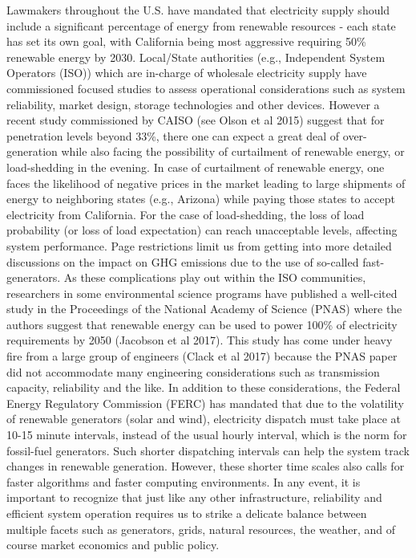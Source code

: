 Lawmakers throughout the U.S. have mandated that electricity supply should include a significant percentage of energy from renewable resources - each state has set its own goal, with California being most aggressive requiring 50\% renewable energy by 2030.  Local/State authorities (e.g., Independent System Operators (ISO)) which are in-charge of wholesale electricity supply have commissioned focused studies to assess operational considerations such as system reliability, market design, storage technologies and other devices.  However a recent study commissioned by CAISO (see Olson et al 2015) suggest that for penetration levels beyond 33\%, there one can expect a great deal of over-generation  while also facing the possibility of curtailment of renewable energy, or load-shedding in the evening.  In case of curtailment of renewable energy, one faces the likelihood of negative prices in the market leading to large shipments of energy to neighboring states (e.g., Arizona) while paying those states to accept electricity from California. For the case of load-shedding, the loss of load probability (or loss of load expectation) can reach unacceptable levels, affecting system performance.  Page restrictions limit us from getting into more detailed discussions on the impact on GHG emissions due to the use of so-called fast-generators.  As these complications play out within the ISO communities, researchers in some environmental science programs have published a well-cited study in the Proceedings of the National Academy of Science (PNAS) where the authors suggest that renewable energy can be used to power 100\% of electricity requirements by 2050  (Jacobson et al 2017).  This study has come under heavy fire from a large group of engineers (Clack et al 2017) because the PNAS paper did not accommodate many engineering considerations such as transmission capacity, reliability and the like.   In addition to these considerations, the Federal Energy Regulatory Commission (FERC) has mandated that due to the volatility of renewable generators (solar and wind), electricity dispatch must take place at 10-15 minute intervals, instead of the usual hourly interval, which is the norm for fossil-fuel generators.  Such shorter dispatching intervals can help the system track changes in renewable generation.  However, these shorter time scales also calls for faster algorithms and faster computing environments.  In any event, it is important to recognize that just like any other infrastructure, reliability and efficient system operation requires us to strike a delicate balance between multiple facets such as generators, grids, natural resources, the weather, and of course market economics and public policy.  
